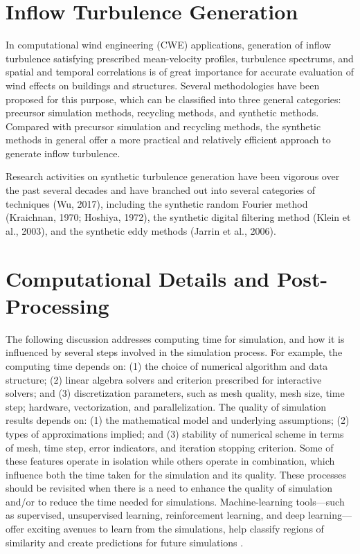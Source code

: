 \section{Inflow Turbulence Generation}
\label{sec:resp_cfd_wind_flow_modeling}

In computational wind engineering (CWE) applications, generation of inflow turbulence satisfying prescribed mean-velocity profiles, turbulence spectrums, and spatial and temporal correlations is of great importance for accurate evaluation of wind effects on buildings and structures. Several methodologies have been proposed for this purpose, which can be classified into three general categories: precursor simulation methods, recycling methods, and synthetic methods. Compared with precursor simulation and recycling methods, the synthetic methods in general offer a more practical and relatively efficient approach to generate inflow turbulence. 

Research activities on synthetic turbulence generation have been vigorous over the past several decades and have branched out into several categories of techniques (Wu, 2017), including the synthetic random Fourier method (Kraichnan, 1970; Hoshiya, 1972), the synthetic digital filtering method (Klein et al., 2003), and the synthetic eddy methods (Jarrin et al., 2006). 

\section{Computational Details and Post-Processing}
\label{sec:resp_cfd_wind_flow_modeling}

The following discussion addresses computing time for simulation, and how it is influenced by several steps involved in the simulation process. For example, the computing time depends on: (1) the choice of numerical algorithm and data structure; (2) linear algebra solvers and criterion prescribed for interactive solvers; and (3) discretization parameters, such as mesh quality, mesh size, time step; hardware, vectorization, and parallelization. The quality of simulation results depends on: (1) the mathematical model and underlying assumptions; (2) types of approximations implied; and (3) stability of numerical scheme in terms of mesh, time step, error indicators, and iteration stopping criterion. Some of these features operate in isolation while others operate in combination, which influence both the time taken for the simulation and its quality. These processes should be revisited when there is a need to enhance the quality of simulation and/or to reduce the time needed for simulations. Machine-learning tools—such as supervised, unsupervised learning, reinforcement learning, and deep learning—offer exciting avenues to learn from the simulations, help classify regions of similarity and create predictions for future simulations \citep{kareem2018generalized}.

